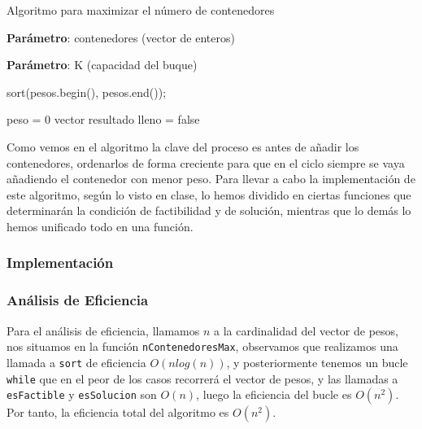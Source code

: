 \begin{algorithm}[H]
    \caption{Algoritmo para maximizar el número de contenedores}\label{alg:max_containers}
    \begin{minipage}{0.92\textwidth}
    \textbf{Parámetro}: contenedores (vector de enteros)

    \textbf{Parámetro}: K (capacidad del buque)

    \end{minipage}

    sort(pesos.begin(), pesos.end());

    peso = 0\;
    vector resultado\;
    lleno = false\;

     {
    }

    
\end{algorithm}

Como vemos en el algoritmo la clave del proceso es antes de añadir los contenedores, ordenarlos de forma creciente para que 
en el ciclo siempre se vaya añadiendo el contenedor con menor peso. 
Para llevar a cabo la implementación de este algoritmo, según lo visto en clase, lo hemos dividido en ciertas funciones que 
determinarán la condición de factibilidad y de solución, mientras que lo demás lo hemos unificado todo en una función. 

\subsubsection{Implementación}



\subsubsection{Análisis de Eficiencia}

Para el análisis de eficiencia, llamamos $n$ a la cardinalidad del vector de pesos, nos situamos en la función \texttt{nContenedoresMax}, observamos que realizamos una llamada a \texttt{sort} de eficiencia $O(nlog(n))$, y posteriormente tenemos un bucle \texttt{while} que en el peor de los casos recorrerá el vector de pesos, y las llamadas a \texttt{esFactible} y \texttt{esSolucion} son $O(n)$, luego la eficiencia del bucle es $O(n^2)$. Por tanto, la eficiencia total del algoritmo es $O(n^2)$.

